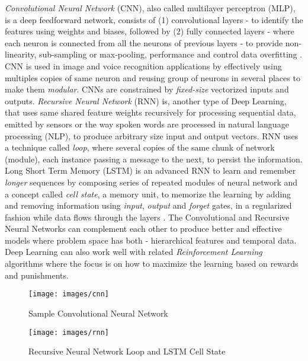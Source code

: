 \documentclass[sigconf]{acmart}
\begin{document}
	{\em Convolutional Neural Network} (CNN), also called multilayer perceptron (MLP), is a deep feedforward network, consists of (1) convolutional layers - to identify the features using weights and biases, followed by (2) fully connected layers - where each neuron is connected from all the neurons of previous layers - to provide non-linearity, sub-sampling or max-pooling, performance and control data overfitting \cite{ChristopherOlah2014}. CNN is used in image and voice recognition applications by effectively using multiples copies of same neuron and reusing group of neurons in several places to make them {\em modular}. CNNs are constrained by {\em fixed-size} vectorized inputs and outputs. {\em Recursive Neural Network} (RNN) is, another type of Deep Learning, that uses same shared feature weights recursively for processing sequential data, emitted by sensors or the way spoken words are processed in natural language processing (NLP), to produce arbitrary size input and output vectors. RNN uses a technique called {\em loop}, where several copies of the same chunk of network (module), each instance passing a message to the next, to persist the information. Long Short Term Memory (LSTM) is an advanced RNN to learn and remember {\em longer} sequences by composing series of repeated modules of neural network and a concept called {\em cell state}, a memory unit, to memorize the learning by adding and removing information using {\em input}, {\em output} and {\em forget} gates, in a regularized fashion while data flows through the layers \cite{Olah2015}. The Convolutional and Recursive Neural Networks can complement each other to produce better and effective models where problem space has both - hierarchical features and temporal data. Deep Learning can also work well with related {\em Reinforcement Learning} algorithms where the focus is on how to maximize the learning based on rewards and punishments.	

	\begin{figure}
		\centering
		\texttt{[image: images/cnn]}
		\caption{Sample Convolutional Neural Network \cite{Chang2016}} \label{fig:figure3} 
	\end{figure}

	\begin{figure}
		\centering
		\texttt{[image: images/rnn]}
		\caption{Recursive Neural Network Loop and LSTM Cell State \cite{LeCun2015, Leonard2016}} \label{fig:figure4} 
	\end{figure}
\end{document}
